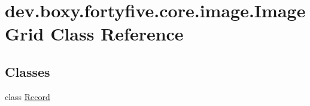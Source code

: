 \hypertarget{classdev_1_1boxy_1_1fortyfive_1_1core_1_1image_1_1_image_grid}{
\section{dev.boxy.fortyfive.core.image.ImageGrid Class Reference}
\label{d1/d3a/classdev_1_1boxy_1_1fortyfive_1_1core_1_1image_1_1_image_grid}
}
\subsection*{Classes}
\begin{DoxyCompactItemize}
\item 
class \hyperlink{classdev_1_1boxy_1_1fortyfive_1_1core_1_1image_1_1_image_grid_1_1_record}{Record}
\end{DoxyCompactItemize}

